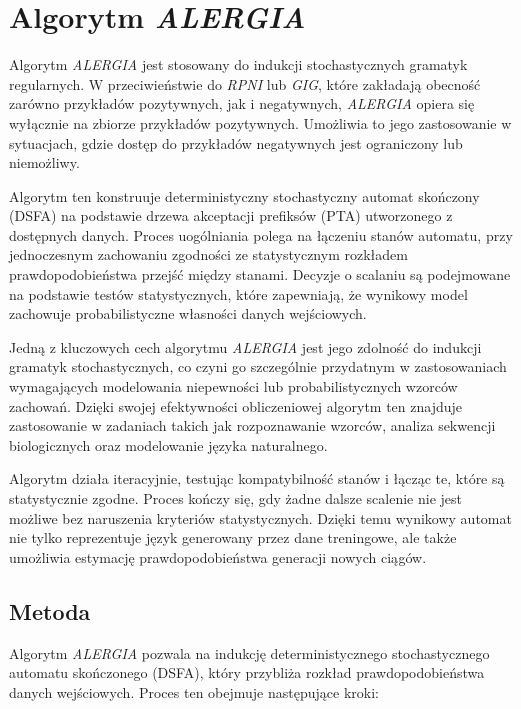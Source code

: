 \section{Algorytm \textit{ALERGIA}}  
\label{sec:alergia}  

Algorytm \textit{ALERGIA} \cite{ALERGIA} jest stosowany do indukcji stochastycznych gramatyk regularnych. W przeciwieństwie do \textit{RPNI} lub \textit{GIG}, które zakładają obecność zarówno przykładów pozytywnych, jak i negatywnych, \textit{ALERGIA} opiera się wyłącznie na zbiorze przykładów pozytywnych. Umożliwia to jego zastosowanie w sytuacjach, gdzie dostęp do przykładów negatywnych jest ograniczony lub niemożliwy.  

Algorytm ten konstruuje deterministyczny stochastyczny automat skończony (DSFA) na podstawie drzewa akceptacji prefiksów (PTA) utworzonego z dostępnych danych. Proces uogólniania polega na łączeniu stanów automatu, przy jednoczesnym zachowaniu zgodności ze statystycznym rozkładem prawdopodobieństwa przejść między stanami. Decyzje o scalaniu są podejmowane na podstawie testów statystycznych, które zapewniają, że wynikowy model zachowuje probabilistyczne własności danych wejściowych.  

Jedną z kluczowych cech algorytmu \textit{ALERGIA} jest jego zdolność do indukcji gramatyk stochastycznych, co czyni go szczególnie przydatnym w zastosowaniach wymagających modelowania niepewności lub probabilistycznych wzorców zachowań. Dzięki swojej efektywności obliczeniowej algorytm ten znajduje zastosowanie w zadaniach takich jak rozpoznawanie wzorców, analiza sekwencji biologicznych oraz modelowanie języka naturalnego.

Algorytm działa iteracyjnie, testując kompatybilność stanów i łącząc te, które są statystycznie zgodne. Proces kończy się, gdy żadne dalsze scalenie nie jest możliwe bez naruszenia kryteriów statystycznych. Dzięki temu wynikowy automat nie tylko reprezentuje język generowany przez dane treningowe, ale także umożliwia estymację prawdopodobieństwa generacji nowych ciągów.


\subsection{Metoda}  
Algorytm \textit{ALERGIA} pozwala na indukcję deterministycznego stochastycznego automatu skończonego (DSFA), który przybliża rozkład prawdopodobieństwa danych wejściowych. Proces ten obejmuje następujące kroki:  

